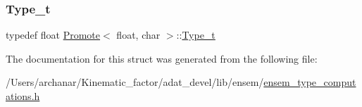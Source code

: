 \subsubsection{\texorpdfstring{Type\_t}{Type\_t}\hspace{0.1cm}{\footnotesize\ttfamily [2/2]}}
{\footnotesize\ttfamily typedef float \mbox{\hyperlink{structPromote}{Promote}}$<$ float, char $>$\+::\mbox{\hyperlink{structPromote_3_01float_00_01char_01_4_a9eacd1e5cdca40ea6e663825796599fc}{Type\+\_\+t}}}



The documentation for this struct was generated from the following file\+:\begin{DoxyCompactItemize}
\item 
/\+Users/archanar/\+Kinematic\+\_\+factor/adat\+\_\+devel/lib/ensem/\mbox{\hyperlink{lib_2ensem_2ensem__type__computations_8h}{ensem\+\_\+type\+\_\+computations.\+h}}\end{DoxyCompactItemize}
